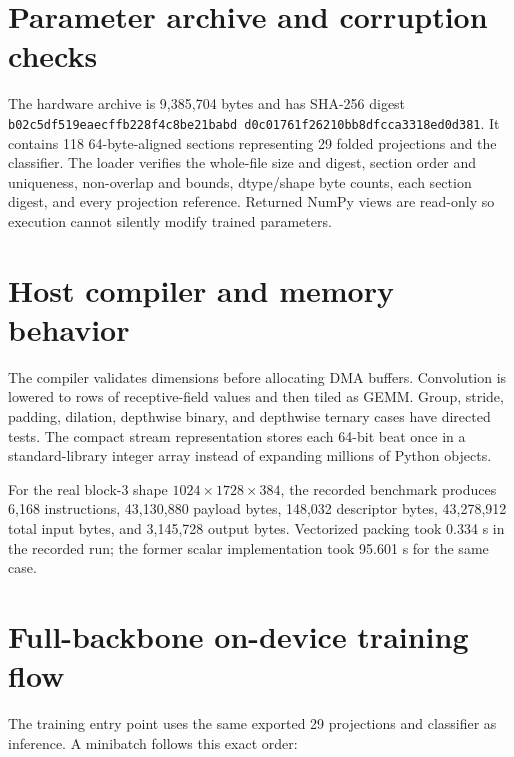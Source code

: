 \documentclass[10pt]{article}
\begin{document}
\section{Parameter archive and corruption checks}

The hardware archive is 9,385,704 bytes and has SHA-256 digest
\texttt{b02c5df5\allowbreak{}19eaecff\allowbreak{}b228f4c8\allowbreak{}be21babd\allowbreak{}
d0c01761\allowbreak{}f26210bb\allowbreak{}8dfcca33\allowbreak{}18ed0d381}.
It contains 118 64-byte-aligned sections representing 29 folded projections
and the classifier. The loader verifies the whole-file size and digest,
section order and uniqueness, non-overlap and bounds, dtype/shape byte counts,
each section digest, and every projection reference. Returned NumPy views are
read-only so execution cannot silently modify trained parameters.

\section{Host compiler and memory behavior}

The compiler validates dimensions before allocating DMA buffers. Convolution
is lowered to rows of receptive-field values and then tiled as GEMM. Group,
stride, padding, dilation, depthwise binary, and depthwise ternary cases have
directed tests. The compact stream representation stores each 64-bit beat once
in a standard-library integer array instead of expanding millions of Python
objects.

For the real block-3 shape $1024\times1728\times384$, the recorded benchmark
produces 6,168 instructions, 43,130,880 payload bytes, 148,032 descriptor bytes,
43,278,912 total input bytes, and 3,145,728 output bytes. Vectorized packing
took 0.334 s in the recorded run; the former scalar implementation took
95.601 s for the same case.

\section{Full-backbone on-device training flow}

The training entry point uses the same exported 29 projections and classifier
as inference. A minibatch follows this exact order:
\end{document}
